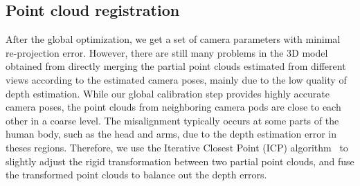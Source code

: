 
\subsection{Point cloud registration}
\label{sec:registration}


After the global optimization, we get a set of camera parameters with minimal re-projection error.
However, there are still many problems in the 3D model obtained from directly merging the partial point clouds estimated from different views according to the estimated camera poses, mainly due to the low quality of depth estimation.
%
%
While our global calibration step provides highly accurate camera poses, the point clouds from neighboring camera pods are close to each other in a coarse level.
The misalignment typically occurs at some parts of the human body, such as the head and arms, due to the depth estimation error in theses regions.
%
Therefore, we use the Iterative Closest Point (ICP) algorithm~\cite{Besl1992A} to slightly adjust the rigid transformation between two partial point clouds, and fuse the transformed point clouds to balance out the depth errors.
%

